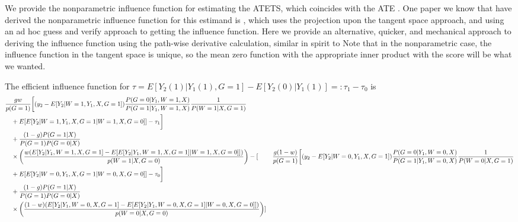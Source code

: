 \documentclass{article}
\begin{document}
We provide the nonparametric influence function for estimating the ATETS, which coincides with the ATE . One paper we know that have derived the nonparametric influence function for this estimand is \cite{chen2021semiparametric}, which uses the projection upon the tangent space approach, and using an ad hoc guess and verify approach to getting the influence function. Here we provide an alternative, quicker, and mechanical approach to deriving the influence function using the path-wise derivative calculation, similar in spirit to \qu \cite{ichimura2022influence}
Note that in the nonparametric case, the influence function in the tangent space is unique, so the mean zero function with the appropriate inner product with the score will be what we wanted.
\todo 
\begin{theorem} 
    The efficient influence function for $\tau = E[ Y_2(1) | Y_1(1) , G=1] - E[ Y_2(0) | Y_1(1)   ]=: \tau_1 - \tau_0 $ is 
    \begin{align}
        &\frac{ g w }{ p(G=1) } \biggl[ (y_2 - E[ Y_2 | W=1 , Y_1 , X, G =1]  ) \frac{ P( G =0| Y_1 , W=1 , X ) }{ P(G=1 | Y_1 , W=1 , X ) } \frac{1}{P( W=1 | X , G=1)}\\
        &\quad+ E [ E[ Y_2 | W = 1, Y_1 , X, G =1 | W =1, X, G= 0 ] ] - \tau_1\biggr] \\
        &\quad+\frac{ (1- g) P(G = 1|X)   }{ P(G= 1) P ( G =0 |X) } \\
        &\quad\times\left( \frac{ w ( E [ Y _ 2 | Y_1,W =1 , X, G =1 ] - E [ E[ Y_2 | Y_1, W=1, X, G=1 ] | W =1, X, G= 0 ] ] ) }{ p ( W =1 | X, G =0 ) } \right)
        -[&\frac{ g (1-w) }{ p(G=1) } \biggl[ (y_2 - E[ Y_2 | W=0 , Y_1 , X, G =1]  ) \frac{ P( G =0| Y_1 , W=0 , X ) }{ P(G=1 | Y_1 , W=0 , X ) } \frac{1}{P( W=0 | X , G=1)}\\
        &\quad+ E [ E[ Y_2 | W = 0, Y_1 , X, G =1 | W =0, X, G= 0 ] ] - \tau_0\biggr] \\
        &\quad+\frac{ (1- g) P(G = 1|X)   }{ P(G= 1) P ( G =0 |X) } \\
        &\quad\times\left( \frac{ (1-w) ( E [ Y _ 2 | Y_1,W =0 , X, G =1 ] - E [ E[ Y_2 | Y_1, W=0, X, G=1 ] | W =0, X, G= 0 ] ] ) }{ p ( W =0 | X, G =0 ) } \right)]
    \end{align}
\end{theorem}
\end{document}
